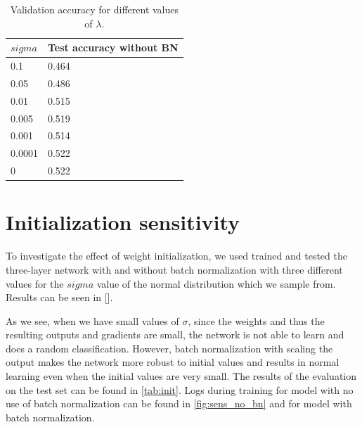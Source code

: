 \documentclass[a4paper]{article}
\begin{document}
\begin{table}[h]
	\centering
	\caption{Validation accuracy for different values of $\lambda$.}
	\label{tab:lambda}
	\begin{tabular}{|l|l|} 
		\hline
		$sigma$ & Test accuracy without BN  \\ 
		\hline
		0.1                       & 0.464                     \\ 
		\hline
		0.05                      & 0.486                     \\ 
		\hline
		0.01                      & 0.515                     \\ 
		\hline
		0.005                     & 0.519                     \\ 
		\hline
		0.001                     & 0.514                     \\ 
		\hline
		0.0001                    & 0.522                     \\ 
		\hline
		0                         & 0.522                     \\
		\hline
	\end{tabular}
\end{table}







\section{Initialization sensitivity}

To investigate the effect of weight initialization, we used trained and tested the three-layer network with and without batch normalization with three different values for the $sigma$ value of the normal distribution which we sample from. Results can be seen in [].

As we see, when we have small values of $\sigma$, since the weights and thus the resulting outputs and gradients are small, the network is not able to learn and does a random classification. However, batch normalization with scaling the output makes the network more robust to initial values and results in normal learning even when the initial values are very small. The results of the evaluation on the test set can be found in \autoref{tab:init}. Logs during training for model with no use of batch normalization can be found in \autoref{fig:sens_no_bn} and  for model with batch normalization.
\end{document}
